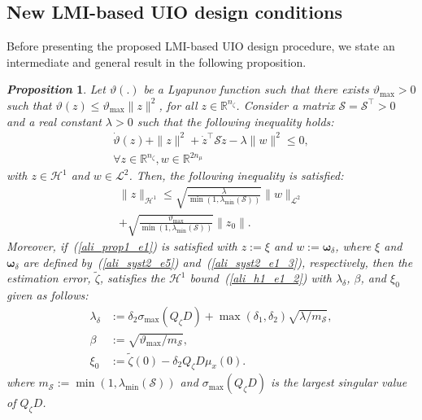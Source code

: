 \documentclass{ifacconf}
\def\eqref#1{(\ref{#1})}
\newtheorem{proposition}{\it \textbf{Proposition}}%
\begin{document}
\subsection{New LMI-based UIO design conditions}
\vspace*{-0.2cm}
%
Before presenting the proposed LMI-based UIO design procedure, we state an intermediate and general result in the following proposition.
%
\begin{proposition}\label{ali_prop1}
Let $\vartheta(.)$ be a Lyapunov function such that there exists $\vartheta_{\max} >0$ such that $\vartheta(z) \leq \vartheta_{\max}\| z \|^{2}$, for all $z \in \mathbb{R}^{n_\zeta}$. Consider a matrix $\mathcal{S} = \mathcal{S}^{\top} > 0$ and a real constant $\lambda >0$ such that the following inequality holds:
\begin{multline}\label{ali_prop1_e1}
\dot{\vartheta}(z) + \| z \|^{2} + \dot{z}^{\top} \mathcal{S} \dot{z} - \lambda \| w \|^{2} \leq 0,\\ 
\forall z \in \mathbb{R}^{n_\zeta}, w \in \mathbb{R}^{2n_{\mu}}
\end{multline}
%
with $z \in \mathcal{H}^{1}$ and $w \in \mathcal{L}^{2}$. Then, the following inequality is satisfied:
\begin{multline}\label{ali_prop1_e2}
\| z \|_{\mathcal{H}^{1}} \leq \sqrt{\frac{\lambda}{\min\left(1,\lambda_{\min}(\mathcal{S})\right)}} \| w \|_{\mathcal{L}^{2}}  \\
+\sqrt{\frac{\vartheta_{\max}}{\min\left(1,\lambda_{\min}(\mathcal{S})\right)}} \| z_0 \|.
\end{multline}
Moreover, if~\eqref{ali_prop1_e1} is satisfied with $z := \xi$ and $w := \bm{\omega}_{\delta}$, where $\xi$ and $\bm{\omega}_{\delta}$ are defined by~\eqref{ali_syst2_e5} and~\eqref{ali_syst2_e1_3}, respectively, then the estimation error, $\tilde{\zeta}$, satisfies the $\mathcal{H}^{1}$ bound~\eqref{ali_h1_e1_2} with $\lambda_{\delta}$, $\beta$, and $\xi_0$ given as follows:
\begin{subequations}
\begin{align}
\lambda_{\delta} &:= \delta_{2}\sigma_{\max}(Q_{\zeta}D)
+\max(\delta_{1},\delta_{2})\sqrt{\lambda/m_{\mathcal S}}, \label{ali_prop1_e3}\\[-0.2em]
\beta &:= \sqrt{\vartheta_{\max}/m_{\mathcal S}}, \label{ali_prop1_e4}\\[-0.2em]
\xi_0 &:= \tilde{\zeta}(0)-\delta_2 Q_{\zeta}D\mu_{x}(0). \label{ali_prop1_e5}
\end{align}
\end{subequations}
where $m_{\mathcal S}:=\min(1,\lambda_{\min}(\mathcal{S}))$ and $\sigma_{\max}(Q_{\zeta}D)$ is the largest singular value of $Q_{\zeta}D$.
\end{proposition}
\end{document}
